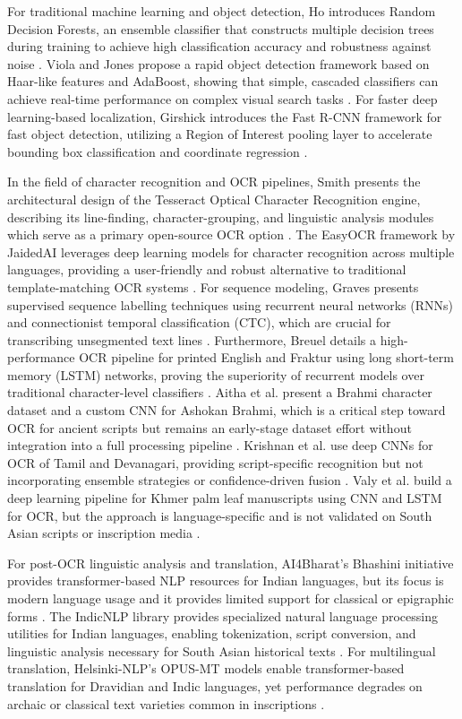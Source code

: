 For traditional machine learning and object detection, Ho introduces Random Decision Forests, an ensemble classifier that constructs multiple decision trees during training to achieve high classification accuracy and robustness against noise \cite{Ho1995}. Viola and Jones propose a rapid object detection framework based on Haar-like features and AdaBoost, showing that simple, cascaded classifiers can achieve real-time performance on complex visual search tasks \cite{Viola2001}. For faster deep learning-based localization, Girshick introduces the Fast R-CNN framework for fast object detection, utilizing a Region of Interest pooling layer to accelerate bounding box classification and coordinate regression \cite{FastRCNN2015}.

In the field of character recognition and OCR pipelines, Smith presents the architectural design of the Tesseract Optical Character Recognition engine, describing its line-finding, character-grouping, and linguistic analysis modules which serve as a primary open-source OCR option \cite{Smith2007}. The EasyOCR framework by JaidedAI leverages deep learning models for character recognition across multiple languages, providing a user-friendly and robust alternative to traditional template-matching OCR systems \cite{EasyOCR2020}. For sequence modeling, Graves presents supervised sequence labelling techniques using recurrent neural networks (RNNs) and connectionist temporal classification (CTC), which are crucial for transcribing unsegmented text lines \cite{Graves2012}. Furthermore, Breuel details a high-performance OCR pipeline for printed English and Fraktur using long short-term memory (LSTM) networks, proving the superiority of recurrent models over traditional character-level classifiers \cite{Breuel2013}. Aitha et al. present a Brahmi character dataset and a custom CNN for Ashokan Brahmi, which is a critical step toward OCR for ancient scripts but remains an early-stage dataset effort without integration into a full processing pipeline \cite{Aitha2023}. Krishnan et al. use deep CNNs for OCR of Tamil and Devanagari, providing script-specific recognition but not incorporating ensemble strategies or confidence-driven fusion \cite{Krishnan2019}. Valy et al. build a deep learning pipeline for Khmer palm leaf manuscripts using CNN and LSTM for OCR, but the approach is language-specific and is not validated on South Asian scripts or inscription media \cite{Valy2021}.

For post-OCR linguistic analysis and translation, AI4Bharat's Bhashini initiative provides transformer-based NLP resources for Indian languages, but its focus is modern language usage and it provides limited support for classical or epigraphic forms \cite{AI4Bharat2022}. The IndicNLP library provides specialized natural language processing utilities for Indian languages, enabling tokenization, script conversion, and linguistic analysis necessary for South Asian historical texts \cite{IndicNLP2022}. For multilingual translation, Helsinki-NLP's OPUS-MT models enable transformer-based translation for Dravidian and Indic languages, yet performance degrades on archaic or classical text varieties common in inscriptions \cite{OPUSMT2020}.

